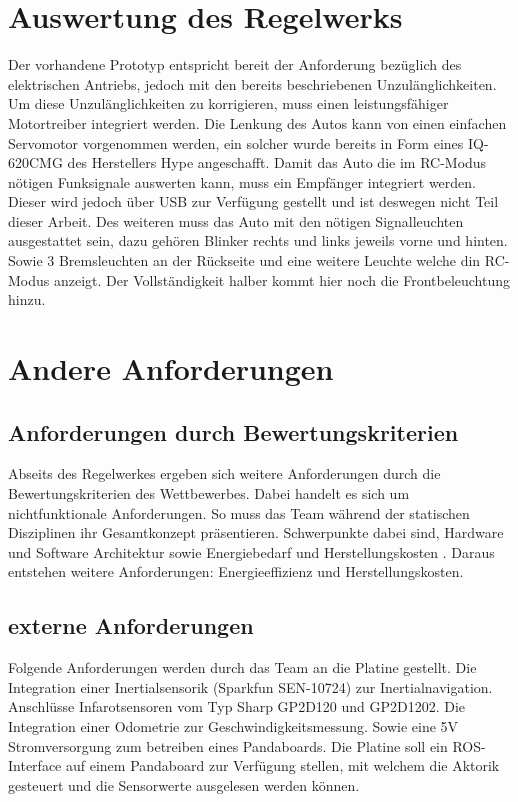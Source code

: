 \section{Auswertung des Regelwerks}
Der vorhandene Prototyp entspricht bereit der Anforderung bezüglich des elektrischen Antriebs, jedoch mit den bereits beschriebenen Unzulänglichkeiten. 
Um diese Unzulänglichkeiten zu korrigieren, muss einen leistungsfähiger Motortreiber integriert werden.
Die Lenkung des Autos kann von einen einfachen Servomotor vorgenommen werden, ein solcher wurde bereits in Form eines IQ-620CMG des Herstellers Hype angeschafft. 
Damit das Auto die im RC-Modus nötigen Funksignale auswerten kann, muss ein Empfänger integriert werden. Dieser wird jedoch über USB zur Verfügung gestellt
und ist deswegen nicht Teil dieser Arbeit. Des weiteren muss das Auto mit den nötigen Signalleuchten ausgestattet sein, dazu gehören Blinker rechts und links
jeweils vorne und hinten. Sowie 3 Bremsleuchten an der Rückseite und eine weitere Leuchte welche din RC-Modus anzeigt. Der Vollständigkeit halber kommt hier noch die
Frontbeleuchtung hinzu.

\section{Andere Anforderungen}
\subsection{Anforderungen durch Bewertungskriterien}
Abseits des Regelwerkes ergeben sich weitere Anforderungen durch die Bewertungskriterien des Wettbewerbes. Dabei handelt es sich um nichtfunktionale Anforderungen.
So muss das Team während der statischen Disziplinen ihr Gesamtkonzept präsentieren. Schwerpunkte dabei sind, Hardware und Software Architektur sowie Energiebedarf und 
Herstellungskosten \cite{website-carolo-cup-regelwerk}. Daraus entstehen weitere Anforderungen: Energieeffizienz und Herstellungskosten. \\


\subsection{externe Anforderungen}
Folgende Anforderungen werden durch das Team an die Platine gestellt. Die Integration einer Inertialsensorik (Sparkfun SEN-10724) zur Inertialnavigation.
Anschlüsse Infarotsensoren vom Typ Sharp GP2D120 und GP2D1202. Die Integration einer Odometrie zur Geschwindigkeitsmessung. 
Sowie eine 5V Stromversorgung zum betreiben eines Pandaboards. Die Platine soll ein ROS-Interface auf einem Pandaboard zur Verfügung stellen, mit welchem die Aktorik gesteuert und
die Sensorwerte ausgelesen werden können.

